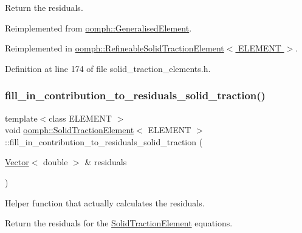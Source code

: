 Return the residuals. 



Reimplemented from \hyperlink{classoomph_1_1GeneralisedElement_a310c97f515e8504a48179c0e72c550d7}{oomph\+::\+Generalised\+Element}.



Reimplemented in \hyperlink{classoomph_1_1RefineableSolidTractionElement_a43a01cb9d3cb2bed34bc0fb811e5f830}{oomph\+::\+Refineable\+Solid\+Traction\+Element$<$ E\+L\+E\+M\+E\+N\+T $>$}.



Definition at line 174 of file solid\+\_\+traction\+\_\+elements.\+h.

\mbox{\label{classoomph_1_1SolidTractionElement_a214fcaf085d96c53115dd3d65677ab0c}} 
\subsubsection{\texorpdfstring{fill\+\_\+in\+\_\+contribution\+\_\+to\+\_\+residuals\+\_\+solid\+\_\+traction()}{fill\_in\_contribution\_to\_residuals\_solid\_traction()}}
{\footnotesize\ttfamily template$<$class E\+L\+E\+M\+E\+NT $>$ \\
void \hyperlink{classoomph_1_1SolidTractionElement}{oomph\+::\+Solid\+Traction\+Element}$<$ E\+L\+E\+M\+E\+NT $>$\+::fill\+\_\+in\+\_\+contribution\+\_\+to\+\_\+residuals\+\_\+solid\+\_\+traction (\begin{DoxyParamCaption}\item[{\hyperlink{classoomph_1_1Vector}{Vector}$<$ double $>$ \&}]{residuals }\end{DoxyParamCaption})\hspace{0.3cm}{\ttfamily [protected]}}



Helper function that actually calculates the residuals. 

Return the residuals for the \hyperlink{classoomph_1_1SolidTractionElement}{Solid\+Traction\+Element} equations. 

